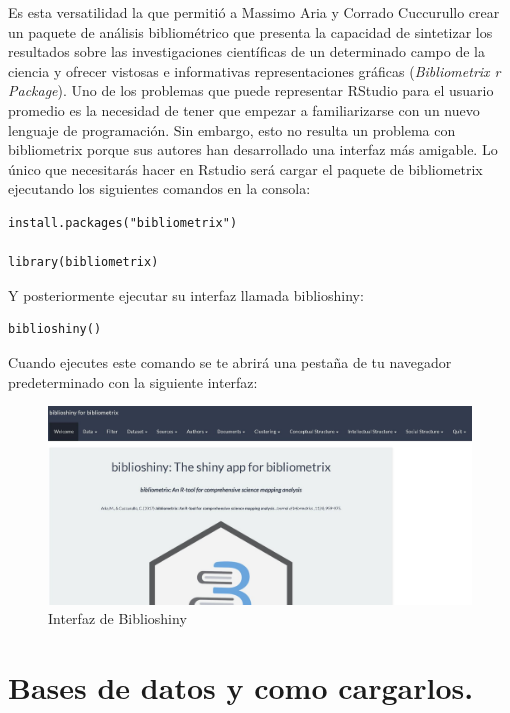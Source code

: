 \documentclass[
]{article}
\begin{document}
Es esta versatilidad la que permitió a Massimo Aria y Corrado Cuccurullo
crear un paquete de análisis bibliométrico que presenta la capacidad de
sintetizar los resultados sobre las investigaciones científicas de un
determinado campo de la ciencia y ofrecer vistosas e informativas
representaciones gráficas (\emph{Bibliometrix r Package}). Uno de los
problemas que puede representar RStudio para el usuario promedio es la
necesidad de tener que empezar a familiarizarse con un nuevo lenguaje de
programación. Sin embargo, esto no resulta un problema con bibliometrix
porque sus autores han desarrollado una interfaz más amigable. Lo único
que necesitarás hacer en Rstudio será cargar el paquete de bibliometrix
ejecutando los siguientes comandos en la consola:

\begin{verbatim}
install.packages("bibliometrix")

library(bibliometrix)
\end{verbatim}

Y posteriormente ejecutar su interfaz llamada biblioshiny:

\begin{verbatim}
biblioshiny()
\end{verbatim}

Cuando ejecutes este comando se te abrirá una pestaña de tu navegador
predeterminado con la siguiente interfaz:

\begin{figure}
\centering
\includegraphics{biblioshinyinterfaz.JPG}
\caption{Interfaz de Biblioshiny}
\end{figure}

\hypertarget{bases-de-datos-y-como-cargarlos.}{%
\section{Bases de datos y como
cargarlos.}\label{bases-de-datos-y-como-cargarlos.}}
\end{document}
